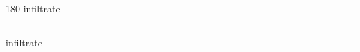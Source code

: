 
\begin{frame}
\begin{center}
\begin{turn}{180}
{\fontsize{2.5cm}{1em}\selectfont infiltrate}
\end{turn}
\vspace{1em}\par  
\hrule
\vspace{1em}\par  
{\fontsize{2.5cm}{1em}\selectfont infiltrate}
\end{center}
\end{frame}
